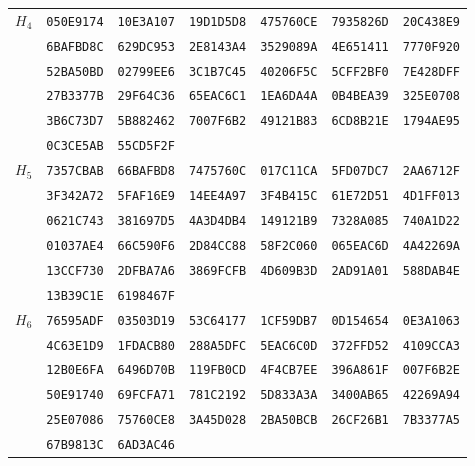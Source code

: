 \begin{table}
\begin{tabular}{@{}ccccccc@{}}
\midrule
\multirow{6}{*}{$H_{4}$}
 & \texttt{050E9174} & \texttt{10E3A107} & \texttt{19D1D5D8} & \texttt{475760CE} & \texttt{7935826D} & \texttt{20C438E9}\\
 & \texttt{6BAFBD8C} & \texttt{629DC953} & \texttt{2E8143A4} & \texttt{3529089A} & \texttt{4E651411} & \texttt{7770F920}\\
 & \texttt{52BA50BD} & \texttt{02799EE6} & \texttt{3C1B7C45} & \texttt{40206F5C} & \texttt{5CFF2BF0} & \texttt{7E428DFF}\\
 & \texttt{27B3377B} & \texttt{29F64C36} & \texttt{65EAC6C1} & \texttt{1EA6DA4A} & \texttt{0B4BEA39} & \texttt{325E0708}\\
 & \texttt{3B6C73D7} & \texttt{5B882462} & \texttt{7007F6B2} & \texttt{49121B83} & \texttt{6CD8B21E} & \texttt{1794AE95}\\
 & \texttt{0C3CE5AB} & \texttt{55CD5F2F}\\

\midrule
\multirow{6}{*}{$H_{5}$}
 & \texttt{7357CBAB} & \texttt{66BAFBD8} & \texttt{7475760C} & \texttt{017C11CA} & \texttt{5FD07DC7} & \texttt{2AA6712F}\\
 & \texttt{3F342A72} & \texttt{5FAF16E9} & \texttt{14EE4A97} & \texttt{3F4B415C} & \texttt{61E72D51} & \texttt{4D1FF013}\\
 & \texttt{0621C743} & \texttt{381697D5} & \texttt{4A3D4DB4} & \texttt{149121B9} & \texttt{7328A085} & \texttt{740A1D22}\\
 & \texttt{01037AE4} & \texttt{66C590F6} & \texttt{2D84CC88} & \texttt{58F2C060} & \texttt{065EAC6D} & \texttt{4A42269A}\\
 & \texttt{13CCF730} & \texttt{2DFBA7A6} & \texttt{3869FCFB} & \texttt{4D609B3D} & \texttt{2AD91A01} & \texttt{588DAB4E}\\
 & \texttt{13B39C1E} & \texttt{6198467F}\\

\midrule
\multirow{6}{*}{$H_{6}$}
 & \texttt{76595ADF} & \texttt{03503D19} & \texttt{53C64177} & \texttt{1CF59DB7} & \texttt{0D154654} & \texttt{0E3A1063}\\
 & \texttt{4C63E1D9} & \texttt{1FDACB80} & \texttt{288A5DFC} & \texttt{5EAC6C0D} & \texttt{372FFD52} & \texttt{4109CCA3}\\
 & \texttt{12B0E6FA} & \texttt{6496D70B} & \texttt{119FB0CD} & \texttt{4F4CB7EE} & \texttt{396A861F} & \texttt{007F6B2E}\\
 & \texttt{50E91740} & \texttt{69FCFA71} & \texttt{781C2192} & \texttt{5D833A3A} & \texttt{3400AB65} & \texttt{42269A94}\\
 & \texttt{25E07086} & \texttt{75760CE8} & \texttt{3A45D028} & \texttt{2BA50BCB} & \texttt{26CF26B1} & \texttt{7B3377A5}\\
 & \texttt{67B9813C} & \texttt{6AD3AC46}\\


\end{tabular}
\end{table}
